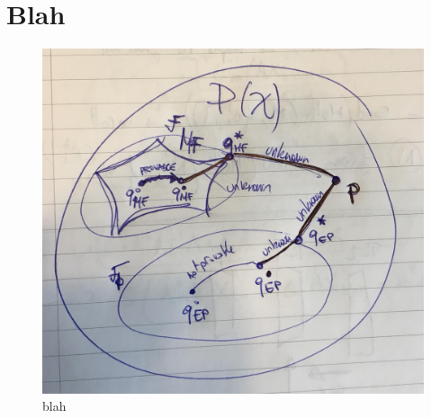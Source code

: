 
\section{Blah}

\begin{figure}[!h]
\center
\includegraphics[width=.6\textwidth]{figures/draft/schema_vb_ep}
\caption{blah}
\end{figure}